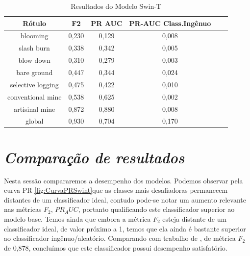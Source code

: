 \begin{table}[h!]
        \caption{Resultados do Modelo Swin-T}
        \centering
    \begin{tabular}{*{6}{c}}
        \toprule
                     Rótulo &  F2    &   PR AUC &  PR-AUC Class.Ingênuo \\
        \midrule
                  blooming &  0,230 &    0,129 &       0,008 \\
                slash burn &  0,338 &    0,342 &       0,005 \\
                 blow down &  0,310 &    0,279 &       0,003 \\
               bare ground &  0,447 &    0,344 &       0,024 \\
         selective logging &  0,475 &    0,422 &       0,010 \\
         conventional mine &  0,538 &    0,625 &       0,002 \\
            artisinal mine &  0,872 &    0,880 &       0,008 \\
                    global &  0,930 &    0,704 &       0,170 \\
        \bottomrule
    \end{tabular}
    \label{table:ResultadosSwinT}
\end{table}
    
    
\section{\textit{Comparação de resultados}}\label{sec:Cap4_Comparação de resultados}    

Nesta sessão compararemos a desempenho dos modelos. Podemos observar pela curva PR \ref{fig:CurvaPRSwint}que as classes mais desafiadoras permanecem distantes de um classificador ideal, contudo pode-se notar um aumento relevante nas métricas $F_2$, $PR_AUC$, portanto qualificando este classificador superior ao modelo base. Temos ainda que embora a métrica $F_2$ esteja distante de um classificador ideal, de valor próximo a 1, temos que ela ainda é bastante superior ao classificador ingênuo/aleatório. Comparando com trabalho de \cite{9701667}, de métrica $F_2$ de 0,878, concluímos que este classificador possui desempenho satisfatório.



